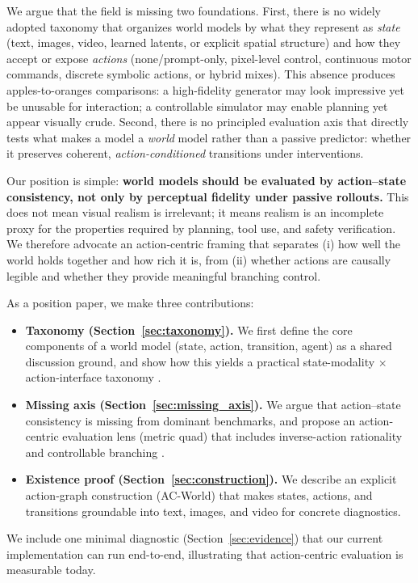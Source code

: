 \documentclass{article}
\theoremstyle{plain}
\theoremstyle{definition}
\theoremstyle{remark}
\begin{document}
We argue that the field is missing two foundations. First, there is no widely adopted taxonomy that organizes world models by what they represent as \emph{state} (text, images, video, learned latents, or explicit spatial structure) and how they accept or expose \emph{actions} (none/prompt-only, pixel-level control, continuous motor commands, discrete symbolic actions, or hybrid mixes). This absence produces apples-to-oranges comparisons: a high-fidelity generator may look impressive yet be unusable for interaction; a controllable simulator may enable planning yet appear visually crude. Second, there is no principled evaluation axis that directly tests what makes a model a \emph{world} model rather than a passive predictor: whether it preserves coherent, \emph{action-conditioned} transitions under interventions.

Our position is simple: \textbf{world models should be evaluated by action--state consistency, not only by perceptual fidelity under passive rollouts.} This does not mean visual realism is irrelevant; it means realism is an incomplete proxy for the properties required by planning, tool use, and safety verification. We therefore advocate an action-centric framing that separates (i) how well the world holds together and how rich it is, from (ii) whether actions are causally legible and whether they provide meaningful branching control.

As a position paper, we make three contributions:
\begin{itemize}[leftmargin=*,itemsep=2pt]
  \item \textbf{Taxonomy (Section~\ref{sec:taxonomy}).} We first define the core components of a world model (state, action, transition, agent) as a shared discussion ground, and show how this yields a practical state-modality $\times$ action-interface taxonomy \cite{ke2023reviewworldmodel}.
  \item \textbf{Missing axis (Section~\ref{sec:missing_axis}).} We argue that action--state consistency is missing from dominant benchmarks, and propose an action-centric evaluation lens (metric quad) that includes inverse-action rationality and controllable branching \cite{zhang2018lpips,unterthiner2019fvd,du2023vbench}.
  \item \textbf{Existence proof (Section~\ref{sec:construction}).} We describe an explicit action-graph construction (AC-World) that makes states, actions, and transitions groundable into text, images, and video for concrete diagnostics.
\end{itemize}
We include one minimal diagnostic (Section~\ref{sec:evidence}) that our current implementation can run end-to-end, illustrating that action-centric evaluation is measurable today.
\end{document}
